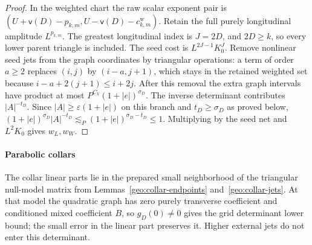 \documentclass[11pt]{amsart}
\theoremstyle{definition}
\theoremstyle{remark}
\numberwithin{equation}{section}
\begin{document}
\begin{proof}
In the weighted chart the raw scalar exponent pair is $(U+\mathsf{v}(D)-p_{k,m},U-\mathsf{v}(D)-c_{k,m}^{\mathrm w})$. Retain the full purely longitudinal amplitude $L^{p_{k,m}}$. The greatest longitudinal index is $J=2D$, and $2D\ge k$, so every lower parent triangle is included. The seed cost is $L^{2J-1}K_0^J$. Remove nonlinear seed jets from the graph coordinates by triangular operations: a term of order $a\ge2$ replaces $(i,j)$ by $(i-a,j+1)$, which stays in the retained weighted set because $i-a+2(j+1)\le i+2j$. After this removal the extra graph intervals have product at most $P^{C_k}(1+|e|)^{\sigma_D}$. The inverse determinant contributes $|A|^{-t_D}$. Since $|A|\ge\varepsilon(1+|e|)$ on this branch and $t_D\ge\sigma_D$ as proved below, $(1+|e|)^{\sigma_D}|A|^{-t_D}\lesssim_P(1+|e|)^{\sigma_D-t_D}\le1$. Multiplying by the seed net and $L^2K_0$ gives $w_L,w_W$.
\end{proof}

\paragraph{Parabolic collars}

The collar linear parts lie in the prepared small neighborhood of the triangular null-model matrix from Lemmas~\ref{geo:collar-endpoints} and~\ref{geo:collar-jets}. At that model the quadratic graph has zero purely transverse coefficient and conditioned mixed coefficient $B$, so $g_D(0)\ne0$ gives the grid determinant lower bound; the small error in the linear part preserves it. Higher external jets do not enter this determinant.
\end{document}

